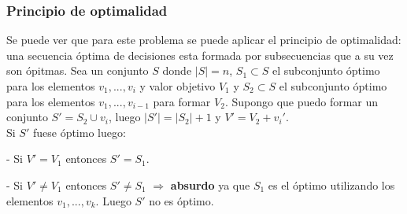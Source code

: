 \subsubsection{Principio de optimalidad}
\par Se puede ver que para este problema se puede aplicar el principio de optimalidad: una secuencia \'optima de
decisiones esta formada por subsecuencias que a su vez son \'opitmas.
Sea un conjunto $S$ donde $|S|=n$, $S_1\subset S$ el subconjunto \'optimo 
para los elementos $v_1, ... , v_i$  y valor objetivo
$V_1$ y $S_2\subset S$ el subconjunto \'optimo para los elementos $v_1, ..., v_{i-1}$ para formar $V_2$.
Supongo que puedo formar un conjunto $S' = S_2\cup {v_i}$, luego $|S'| = |S_2| + 1$ y $V'= V_2 + v_i'$.
\\ Si $S'$ fuese \'optimo luego:
\par - Si $V' = V_1$ entonces $S' = S_1$. 
\par - Si $V' \neq V_1$ entonces $S' \neq S_1$ $\Rightarrow$ \textbf{absurdo} ya que $S_1$ es el \'optimo utilizando
los elementos $v_1, ... ,v_k$. Luego $S'$ no es \'optimo.

